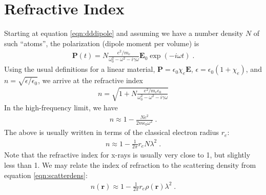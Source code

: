 \documentclass[12pt]{article}
\renewcommand{\vec}[1]{\boldsymbol{#1}}
\begin{document}
\section{Refractive Index}

Starting at equation \ref{eqn:dddipole} and assuming we have a number density 
$N$ of such ``atoms'', the polarization (dipole moment per volume) is
\begin{align}
\vec{P}(t) = N \frac{e^2/m_e}{\omega_0^2 - \omega^2 - i \gamma \omega}\vec{E}_0 
\exp(-i\omega t) \;.
\end{align}
Using the usual definitions for a linear material, $\vec{P} = \epsilon_0 \chi_e 
\vec{E}$, $\epsilon = \epsilon_0 (1+\chi_e)$, and $n = 
\sqrt{\epsilon/\epsilon_0}$, we arrive at the refractive index 
\begin{align}
 n = \sqrt{1+N \frac{e^2/m_e\epsilon_0}{\omega_0^2 - \omega^2 - i 
\gamma \omega}} 
\end{align}
In the high-frequency limit, we have
\begin{align}
 n \approx 1 - \frac{N e^2}{2 m \epsilon_0 \omega^2}  \;.
\end{align}
The above is usually written in terms of the classical electron radius $r_e$:
\begin{align}
 n \approx 1 - \frac{1}{2\pi} r_e N \lambda^2 \;.
\end{align}
Note that the refractive index for x-rays is usually very close to 1, but 
slightly less than 1.  We may relate the index of refraction to the scattering 
density from equation \ref{eqn:scatterdens}:
\begin{align}
 n(\vec{r}) \approx 1 - \frac{1}{2\pi} r_e \rho(\vec{r}) \lambda^2 \;.
\end{align}

% 
\end{document}
